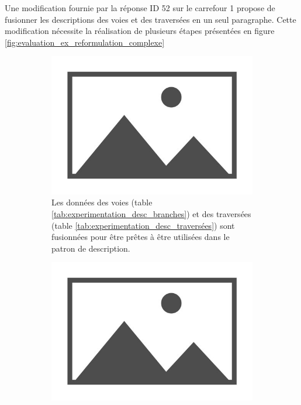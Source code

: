 \newpar{}

Une modification fournie par la réponse ID 52 sur le carrefour 1 propose de fusionner les descriptions des voies et des traversées en un seul paragraphe. Cette modification nécessite la réalisation de plusieurs étapes présentées en figure \ref{fig:evaluation_ex_reformulation_complexe}

\begin{figure}[ht]
    \centering
    \begin{subfigure}[t]{0.49\linewidth}
        \includegraphics[width=\textwidth]{images/placeholder.jpg}
        \caption{Les données des voies (table \ref{tab:experimentation_desc_branches}) et des traversées (table \ref{tab:experimentation_desc_traversées}) sont fusionnées pour être prêtes à être utilisées dans le patron de description.}
    \end{subfigure}
    \begin{subfigure}[t]{0.49\linewidth}
        \includegraphics[width=\textwidth]{images/placeholder.jpg}

\end{subfigure}
\end{figure}
